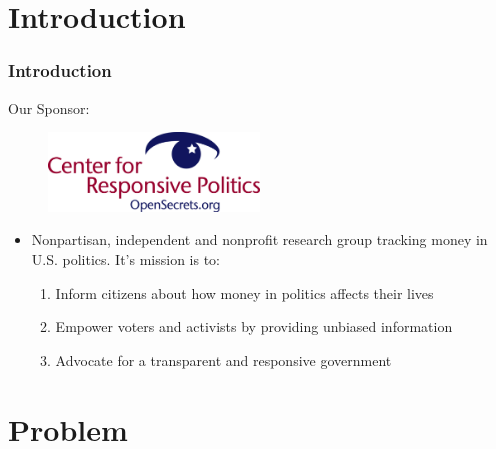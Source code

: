\documentclass[compress,handout,10pt]{beamer}
\let\olditem\item
\renewcommand{\item}{\setlength{\itemsep}{0.5\baselineskip}\olditem}
\begin{document}
\section{Introduction}
\begin{frame}
    \frametitle{Introduction}

Our Sponsor:
\begin{center}
    \begin{figure}
            \includegraphics[width=0.5\textwidth]{images/CRP.jpeg}
    \end{figure}
    \vspace{10pt}

\begin{itemize}
\pause \item Nonpartisan, independent and nonprofit research group tracking money in U.S. politics. It's mission is to:
\vspace{7pt}
\begin{enumerate}
\pause \item Inform citizens about how money in politics affects their lives
\pause \item Empower voters and activists by providing unbiased information
\pause \item Advocate for a transparent and responsive government
\end{enumerate}
\end{itemize}
\end{center}
\end{frame}

\section{Problem}
\end{document}
